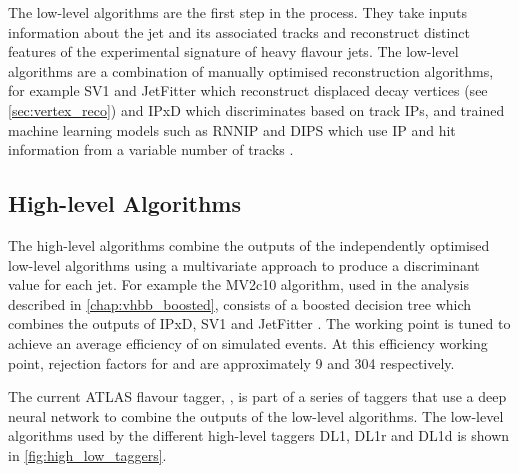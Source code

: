 The low-level algorithms are the first step in the \btagging process.
They take inputs information about the jet and its associated tracks and reconstruct distinct features of the experimental signature of heavy flavour jets.
The low-level algorithms are a combination of manually optimised reconstruction algorithms, for example SV1 and JetFitter which reconstruct displaced decay vertices (see \cref{sec:vertex_reco}) and IPxD which discriminates based on track IPs, and trained machine learning models such as RNNIP and DIPS which use IP and hit information from a variable number of tracks \cite{ATL-PHYS-PUB-2017-003,ATL-PHYS-PUB-2020-014}.

\subsection{High-level Algorithms}\label{sec:high_level_algs}

The high-level algorithms combine the outputs of the independently optimised low-level algorithms using a multivariate approach to produce a discriminant value for each jet.
For example the MV2c10 algorithm, used in the analysis described in \cref{chap:vhbb_boosted}, consists of a boosted decision tree which combines the outputs of IPxD, SV1 and JetFitter \cite{ATL-PHYS-PUB-2015-022,FTAG-2018-01,ATL-PHYS-PUB-2017-013}.
The working point is tuned to achieve an average \bjet efficiency of  on simulated \ttbar events.
At this efficiency working point, rejection factors for \cjets and \ljets are approximately 9 and 304 respectively.

The current ATLAS flavour tagger, \DLr \cite{ATL-PHYS-PUB-2017-013}, is part of a series of taggers that use a deep neural network to combine the outputs of the low-level algorithms.
The low-level algorithms used by the different high-level taggers DL1, DL1r and DL1d is shown in \cref{fig:high_low_taggers}.



